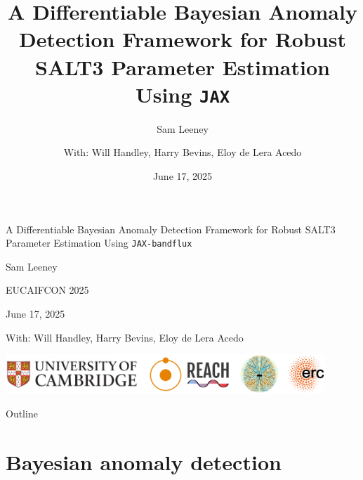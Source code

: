 \documentclass[aspectratio=169]{beamer}
\title{A Differentiable Bayesian Anomaly Detection Framework for Robust SALT3 Parameter Estimation Using \texttt{JAX}}
\subtitle{Sam Leeney}
\date{June 17, 2025}
\author{With: Will Handley, Harry Bevins, Eloy de Lera Acedo}
\institute{} %
\begin{document}
\begin{frame}
  \begin{center}
    {\Large A Differentiable Bayesian Anomaly Detection Framework for Robust SALT3 Parameter Estimation Using \texttt{JAX-bandflux}\par}
    \vspace{0.3cm}

    {\normalsize Sam Leeney\par}
    \vspace{0.3cm}

    {\small EUCAIFCON 2025\par}
    {\small June 17, 2025\par}
    \vspace{0.5cm}

    {\scriptsize With: Will Handley, Harry Bevins, Eloy de Lera Acedo\par}
    \vfill

    \includegraphics[width=0.9\textwidth]{images/affiliations.png}
  \end{center}
\end{frame}

\begin{frame}{Outline}
  \tableofcontents[hideallsubsections]
\end{frame}


\section{Bayesian anomaly detection}
\end{document}
